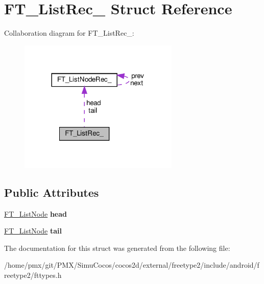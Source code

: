 \hypertarget{structFT__ListRec__}{}\section{F\+T\+\_\+\+List\+Rec\+\_\+ Struct Reference}
\label{structFT__ListRec__}


Collaboration diagram for F\+T\+\_\+\+List\+Rec\+\_\+\+:
\nopagebreak
\begin{figure}[H]
\begin{center}
\leavevmode
\includegraphics[width=216pt]{structFT__ListRec____coll__graph}
\end{center}
\end{figure}
\subsection*{Public Attributes}
\begin{DoxyCompactItemize}
\item 
\mbox{\label{structFT__ListRec___a09ed35c2bcdc1c3acd12ff4650dfdeb9}} 
\hyperlink{structFT__ListNodeRec__}{F\+T\+\_\+\+List\+Node} {\bfseries head}
\item 
\mbox{\label{structFT__ListRec___a4664761f0ab2af3d48231b00cd978b23}} 
\hyperlink{structFT__ListNodeRec__}{F\+T\+\_\+\+List\+Node} {\bfseries tail}
\end{DoxyCompactItemize}


The documentation for this struct was generated from the following file\+:\begin{DoxyCompactItemize}
\item 
/home/pmx/git/\+P\+M\+X/\+Simu\+Cocos/cocos2d/external/freetype2/include/android/freetype2/fttypes.\+h\end{DoxyCompactItemize}
